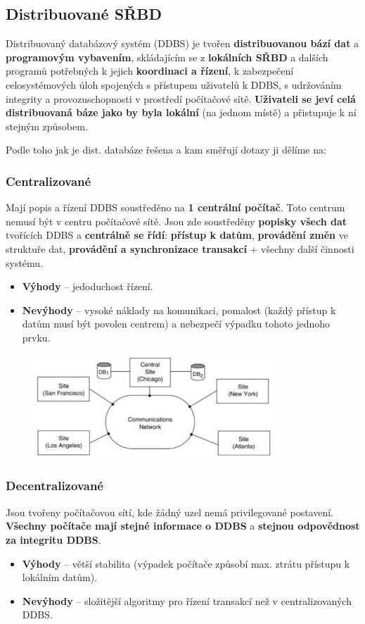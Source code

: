 
\subsection{Distribuované SŘBD}
Distribuovaný databázový systém (DDBS) je tvořen \textbf{distribuovanou bází dat} a \textbf{programovým vybavením}, skládajícím se z \textbf{lokálních SŘBD} a dalších programů potřebných k jejich \textbf{koordinaci a řízení}, k zabezpečení celosystémových úloh spojených s přístupem uživatelů k DDBS, s udržováním integrity a provozuschopnosti v prostředí počítačové sítě. \textbf{Uživateli se jeví celá distribuovaná báze jako by byla lokální} (na jednom místě) a přistupuje k ní stejným způsobem. 

Podle toho jak je dist. databáze řešena a kam směřují dotazy ji dělíme na: 

\subsubsection{Centralizované}
Mají popis a řízení DDBS soustředěno na \textbf{1 centrální počítač}. Toto centrum nemusí být v centru počítačové sítě. Jsou zde soustředěny \textbf{popisky všech dat} tvořících DDBS a \textbf{centrálně se řídí}: \textbf{přístup k datům}, \textbf{provádění změn} ve struktuře dat, \textbf{provádění a synchronizace transakcí} + všechny další činnosti systému. 
\begin{itemize}
	\item \textbf{Výhody} -- jedoduchost řízení.
	\item \textbf{Nevýhody} -- vysoké náklady na komunikaci, pomalost (každý přístup k datům musí být povolen centrem) a nebezpečí výpadku tohoto jednoho prvku.
\end{itemize}

\begin{figure}[H]
\centering
\includegraphics[width=0.8\textwidth]{assets/ddbs1.png}
\end{figure}

\subsubsection{Decentralizované}
Jsou tvořeny počítačovou sítí, kde žádný uzel nemá privilegované postavení. \textbf{Všechny počítače mají stejné informace o DDBS} a \textbf{stejnou odpovědnost za integritu DDBS}.
\begin{itemize}
	\item \textbf{Výhody} -- větší stabilita (výpadek počítače způsobí max. ztrátu přístupu k lokálním datům).
	\item \textbf{Nevýhody} -- složitější algoritmy pro řízení transakcí než v centralizovaných DDBS.
\end{itemize}

